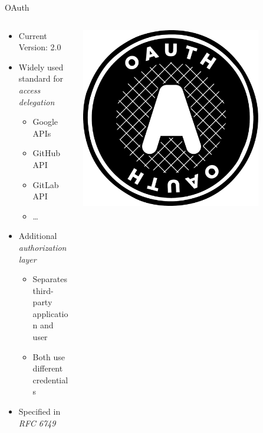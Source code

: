 \documentclass[aspectratio=169]{beamer}
\begin{document}
\begin{frame}[label=oauth-intro]{OAuth}
	\begin{columns}
		\begin{column}{0.7\textwidth}
			\begin{itemize}
				\item Current Version: 2.0
				\item Widely used standard for \emph{access delegation}
				\begin{itemize}
					\item Google APIs %
					\item GitHub API %
					\item GitLab API %
					\item \dots
				\end{itemize}
				\item Additional \emph{authorization layer}
				\begin{itemize}
					\item Separates third-party application and user
					\item Both use different credentials
				\end{itemize}
				\item Specified in \emph{RFC 6749}
			\end{itemize}
		\end{column}
		
		\begin{column}{0.3\textwidth}
			\includegraphics[width=0.8\textwidth]{figures/oauth_logo}
		\end{column}
	\end{columns}
\end{frame}
\end{document}
